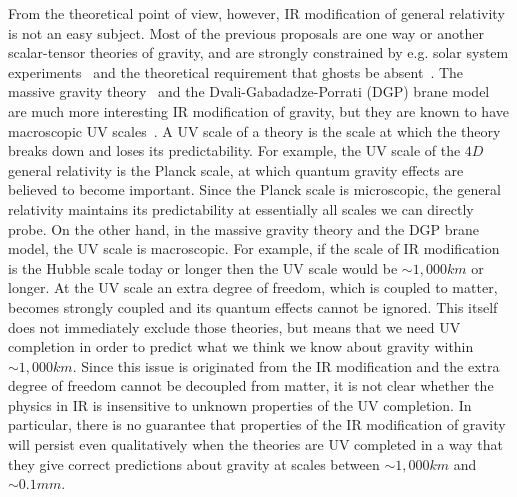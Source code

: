 From the theoretical point of view, however, IR modification of general
relativity~\cite{Brans:1961sx,Dicke:1961gz,Bergmann:1968ve,Clayton:1998hv,Clayton:1999zs,Clayton:2001rt,Moffat:2002kj,Drummond:1999ut,Drummond:2001rj,Carroll:2003wy} 
is not an easy subject. Most of the previous proposals are one way or
another scalar-tensor theories of gravity, and are strongly constrained
by e.g. solar system experiments~\cite{Will:1993ns} and the theoretical
requirement that ghosts be
absent~\cite{Cline:2003gs,DeFelice:2006pg,Calcagni:2006ye}. The massive
gravity theory~\cite{Fierz:1939ix} and the Dvali-Gabadadze-Porrati (DGP)
brane model~\cite{Dvali:2000hr} are much more interesting IR
modification of gravity, but they are known to have macroscopic UV 
scales~\cite{Arkani-Hamed:2002sp,Luty:2003vm}. A UV scale of a theory is
the scale at which the theory breaks down and loses its
predictability. For example, the UV scale of the $4D$ general relativity
is the Planck scale, at which quantum gravity effects are believed to 
become important. Since the Planck scale is microscopic, the general
relativity maintains its predictability at essentially all scales we can
directly probe. On the other hand, in the massive gravity theory and the
DGP brane model, the UV scale is macroscopic. For example, if the scale
of IR modification is the Hubble scale today or longer then the UV scale
would be $\sim 1,000km$ or longer. At the UV scale an extra degree of
freedom, which is coupled to matter, becomes strongly coupled and its
quantum effects cannot be ignored. This itself does not immediately
exclude  those theories, but means that we need UV completion in order
to predict what we think we know about gravity within $\sim
1,000km$. Since this issue is originated from the IR modification and
the extra degree of freedom cannot be decoupled from matter, it is not
clear whether the physics in IR is insensitive to unknown properties of
the UV completion. In particular, there is no guarantee that properties
of the IR modification of gravity will persist even qualitatively when
the theories are UV completed in a way that they give correct
predictions about gravity at scales between $\sim 1,000km$ and 
$\sim 0.1mm$. 




